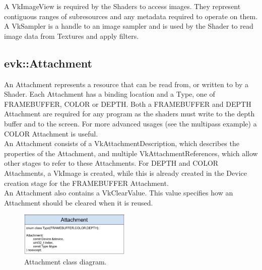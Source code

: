 \documentclass[12pt]{report}
\newcommand{\figurewidth}{0.55\textwidth}
\newcommand{\imagewidth}{0.47\textwidth}
\theoremstyle{definition}
\begin{document}
        A VkImageView is required by the Shaders to access images. They
        represent contiguous ranges of subresources and any metadata
        required to operate on them. A VkSampler is a handle to an image
        sampler and is used by the Shader to read image data from Textures
        and apply filters.

      \subsection{evk::Attachment}

        An Attachment represents a resource that can be read from, or written
        to by a Shader. Each Attachment has a binding location and a Type, one
        of FRAMEBUFFER, COLOR or DEPTH. Both a FRAMEBUFFER and DEPTH Attachment
        are required for any program as the shaders must write to the depth
        buffer and to the screen. For more advanced usages (see the multipass
        example) a COLOR Attachment is useful. \\

        An Attachment consists of a VkAttachmentDescription, which describes
        the properties of the Attachment, and multiple VkAttachmentReferences,
        which allow other stages to refer to these Attachments. For DEPTH and
        COLOR Attachments, a VkImage is created, while this is already created
        in the Device creation stage for the FRAMEBUFFER Attachment. \\

        An Attachment also contains a VkClearValue. This value specifies how an
        Attachment should be cleared when it is reused. \\

        \begin{figure}
          \centering
          \includegraphics[width=\imagewidth]{images/class_attachment.png}
          \caption{Attachment class diagram.}
          \label{fig:class_attachment}  
        \end{figure}
\end{document}
